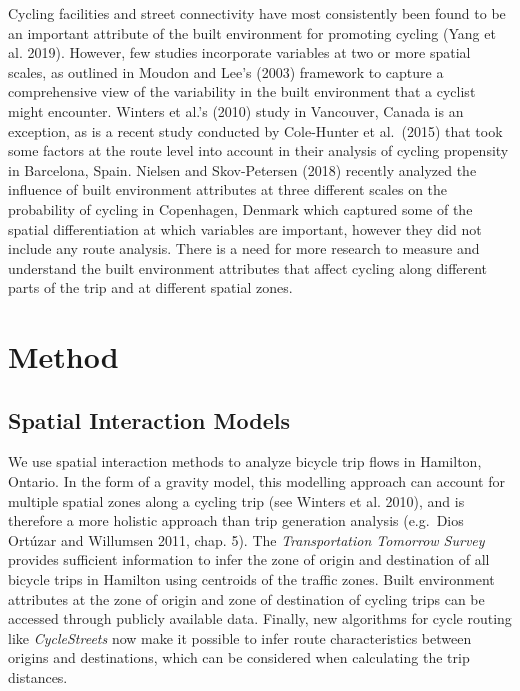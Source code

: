 \documentclass[smallextended]{svjour3}       %
\begin{document}
Cycling facilities and street connectivity have most consistently been
found to be an important attribute of the built environment for
promoting cycling (Yang et al. 2019). However, few studies incorporate
variables at two or more spatial scales, as outlined in Moudon and Lee's
(2003) framework to capture a comprehensive view of the variability in
the built environment that a cyclist might encounter. Winters et al.'s
(2010) study in Vancouver, Canada is an exception, as is a recent study
conducted by Cole-Hunter et al.~(2015) that took some factors at the
route level into account in their analysis of cycling propensity in
Barcelona, Spain. Nielsen and Skov-Petersen (2018) recently analyzed the
influence of built environment attributes at three different scales on
the probability of cycling in Copenhagen, Denmark which captured some of
the spatial differentiation at which variables are important, however
they did not include any route analysis. There is a need for more
research to measure and understand the built environment attributes that
affect cycling along different parts of the trip and at different
spatial zones.

\hypertarget{sec:method}{%
\section{Method}\label{sec:method}}

\hypertarget{model}{%
\subsection{Spatial Interaction Models}\label{model}}

We use spatial interaction methods to analyze bicycle trip flows in
Hamilton, Ontario. In the form of a gravity model, this modelling
approach can account for multiple spatial zones along a cycling trip
(see Winters et al. 2010), and is therefore a more holistic approach
than trip generation analysis (e.g.~Dios Ortúzar and Willumsen 2011,
chap. 5). The \emph{Transportation Tomorrow Survey} provides sufficient
information to infer the zone of origin and destination of all bicycle
trips in Hamilton using centroids of the traffic zones. Built
environment attributes at the zone of origin and zone of destination of
cycling trips can be accessed through publicly available data. Finally,
new algorithms for cycle routing like \emph{CycleStreets} now make it
possible to infer route characteristics between origins and
destinations, which can be considered when calculating the trip
distances.
\end{document}
